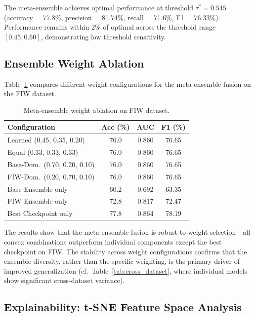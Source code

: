 \documentclass[journal,12pt]{IEEEtran}
\begin{document}
The meta-ensemble achieves optimal performance at threshold
$\tau^* = 0.545$ (accuracy = 77.8\%, precision = 81.74\%, recall = 71.6\%,
F1 = 76.33\%). Performance remains within 2\% of optimal across the
threshold range $[0.45, 0.60]$, demonstrating low threshold sensitivity.

\subsection{Ensemble Weight Ablation}
\label{sec:weight_ablation}

Table~\ref{tab:weight_ablation} compares different weight configurations
for the meta-ensemble fusion on the FIW dataset.

\begin{table}[t]
    \centering
    \caption{Meta-ensemble weight ablation on FIW dataset.}
    \label{tab:weight_ablation}
    \begin{tabular}{lccc}
        \toprule
        \textbf{Configuration} & \textbf{Acc (\%)} & \textbf{AUC} & \textbf{F1 (\%)} \\
        \midrule
        Learned (0.45, 0.35, 0.20) & 76.0 & 0.860 & 76.65 \\
        Equal (0.33, 0.33, 0.33)   & 76.0 & 0.860 & 76.65 \\
        Base-Dom.\ (0.70, 0.20, 0.10) & 76.0 & 0.860 & 76.65 \\
        FIW-Dom.\ (0.20, 0.70, 0.10) & 76.0 & 0.860 & 76.65 \\
        \midrule
        Base Ensemble only         & 60.2 & 0.692 & 63.35 \\
        FIW Ensemble only          & 72.8 & 0.817 & 72.47 \\
        Best Checkpoint only       & 77.8 & 0.864 & 78.19 \\
        \bottomrule
    \end{tabular}
\end{table}

The results show that the meta-ensemble fusion is robust to weight
selection—all convex combinations outperform individual components
except the best checkpoint on FIW. The stability across weight
configurations confirms that the ensemble diversity, rather than the
specific weighting, is the primary driver of improved generalization
(cf.\ Table~\ref{tab:cross_dataset}, where individual models show
significant cross-dataset variance).

\subsection{Explainability: t-SNE Feature Space Analysis}
\label{sec:tsne}
\end{document}
